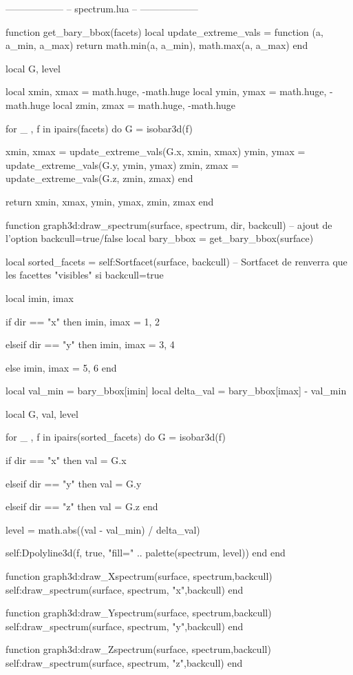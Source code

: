 \documentclass{standalone}
\begin{document}
\begin{luacode*}
------------------
-- spectrum.lua --
------------------

function get_bary_bbox(facets)
  local update_extreme_vals = function (a, a_min, a_max)
    return math.min(a, a_min), math.max(a, a_max)
  end

  local G, level

  local xmin, xmax = math.huge, -math.huge
  local ymin, ymax = math.huge, -math.huge
  local zmin, zmax = math.huge, -math.huge

  for _ , f in ipairs(facets) do
    G = isobar3d(f)

    xmin, xmax = update_extreme_vals(G.x, xmin, xmax)
    ymin, ymax = update_extreme_vals(G.y, ymin, ymax)
    zmin, zmax = update_extreme_vals(G.z, zmin, zmax)
  end

  return {xmin, xmax, ymin, ymax, zmin, zmax}
end

function graph3d:draw_spectrum(surface, spectrum, dir, backcull) -- ajout de l'option backcull=true/false
  local bary_bbox = get_bary_bbox(surface)

  local sorted_facets = self:Sortfacet(surface, backcull) -- Sortfacet de renverra que les facettes "visibles"  si backcull=true

  local imin, imax

  if dir == "x" then
    imin, imax = 1, 2

  elseif dir == "y" then
    imin, imax = 3, 4

  else
    imin, imax = 5, 6
  end

  local val_min   = bary_bbox[imin]
  local delta_val = bary_bbox[imax] - val_min

  local G, val, level

  for _ , f in ipairs(sorted_facets) do
    G = isobar3d(f)

    if dir == "x" then
      val = G.x

    elseif dir == "y" then
      val = G.y

    elseif dir == "z" then
      val = G.z
    end

    level = math.abs((val - val_min) / delta_val)

    self:Dpolyline3d(f, true, "fill=" .. palette(spectrum, level))
  end
end

function graph3d:draw_Xspectrum(surface, spectrum,backcull)
  self:draw_spectrum(surface, spectrum, "x",backcull)
end

function graph3d:draw_Yspectrum(surface, spectrum,backcull)
  self:draw_spectrum(surface, spectrum, "y",backcull)
end

function graph3d:draw_Zspectrum(surface, spectrum,backcull)
  self:draw_spectrum(surface, spectrum, "z",backcull)
end
\end{luacode*}
\end{document}
